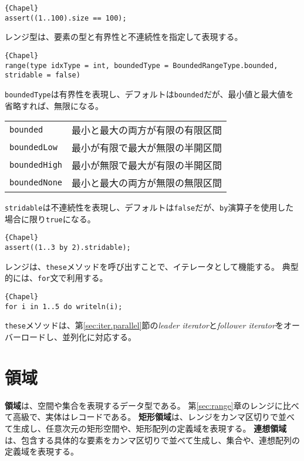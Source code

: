 \documentclass[10pt,a4paper]{book}
\begin{document}
\begin{Verbatim}{Chapel}
assert((1..100).size == 100);
\end{Verbatim}

レンジ型は、要素の型と有界性と不連続性を指定して表現する。

\begin{Verbatim}{Chapel}
range(type idxType = int, boundedType = BoundedRangeType.bounded, stridable = false)
\end{Verbatim}

\verb#boundedType#は有界性を表現し、デフォルトは\verb#bounded#だが、最小値と最大値を省略すれば、無限になる。

\begin{table}[h]
\raggedright
\begin{tabular}{ll}
\verb#bounded#     & 最小と最大の両方が有限の有限区間 \\
\verb#boundedLow#  & 最小が有限で最大が無限の半開区間 \\
\verb#boundedHigh# & 最小が無限で最大が有限の半開区間 \\
\verb#boundedNone# & 最小と最大の両方が無限の無限区間 \\
\end{tabular}
\end{table}

\verb#stridable#は不連続性を表現し、デフォルトは\verb#false#だが、\verb#by#演算子を使用した場合に限り\verb#true#になる。

\begin{Verbatim}{Chapel}
assert((1..3 by 2).stridable);
\end{Verbatim}

レンジは、\verb#these#メソッドを呼び出すことで、イテレータとして機能する。
典型的には、\verb#for#文で利用する。

\begin{Verbatim}{Chapel}
for i in 1..5 do writeln(i);
\end{Verbatim}

\verb#these#メソッドは、第\ref{sec:iter.parallel}節の\textit{leader iterator}と\textit{follower iterator}をオーバーロードし、並列化に対応する。

\chapter{領域\label{sec:domain}}

\textbf{領域}は、空間や集合を表現するデータ型である。
第\ref{sec:range}章のレンジに比べて高級で、実体はレコードである。
\textbf{矩形領域}は、レンジをカンマ区切りで並べて生成し、任意次元の矩形空間や、矩形配列の定義域を表現する。
\textbf{連想領域}は、包含する具体的な要素をカンマ区切りで並べて生成し、集合や、連想配列の定義域を表現する。
\end{document}
